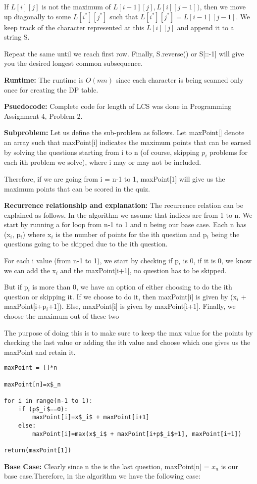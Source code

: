 \documentclass[letterpaper,11pt]{article}
\newcounter{problemid}\stepcounter{problemid}
\def\newproblem{\vspace*{0.5cm}{\bf Problem~\arabic{problemid}\stepcounter{problemid}}\hfill\fbox{\parbox{0.16\textwidth}{\bf Points:}}\par}
\begin{document}
If $L[i][j]$ is not the maximum of $L[i-1][j], L[i][j-1])$, then we move up diagonally to some $L[i^*][j^*]$ such that $L[i^*][j^*] =  L[i-1][j-1]$. We keep track of the character represented at this $L[i][j]$ and append it to a string S.

Repeat the same until we reach first row. Finally, S.reverse() or S[::-1] will give you the desired longest common subsequence.

{\bf Runtime:} The runtime is $O(mn)$ since each character is being scanned only once for creating the DP table. 

{\bf Psuedocode: }Complete code for length of LCS was done in Programming Assignment 4, Problem 2. 


\newproblem
{\bf Subproblem:} Let us define the sub-problem as follows. Let maxPoint[] denote an array such that maxPoint[i] indicates the maximum points that can be earned by solving the questions starting from i to n (of course, skipping $p_i$ problems for each ith problem we solve), where i may or may not be included. 

Therefore, if we are going from i = n-1 to 1, maxPoint[1] will give us the maximum points that can be scored in the quiz. 

{\bf Recurrence relationship and explanation:} The recurrence relation can be explained as follows. In the algorithm we assume that indices are from 1 to n. We start by running a for loop from n-1 to 1 and n being our base case. Each n has (x$_i$, p$_i$) where x$_i $ is the number of points for the ith question and p$_i$ being the questions going to be skipped due to the ith question. 

For each i value (from n-1 to 1), we start by checking if p$_i$ is 0, if it is 0, we know we can add the x$_i$ and the maxPoint[i+1], no question has to be skipped. 

But if p$_i$ is more than 0, we have an option of either choosing to do the ith question or skipping it. If we choose to do it, then maxPoint[i] is given by (x$_i$ + maxPoint[i+p$_i$+1]). Else, maxPoint[i] is given by maxPoint[i+1]. Finally, we choose the maximum out of these two 

The purpose of doing this is to make sure to keep the max value for the points by checking the last value or adding the ith value and choose which one gives us the maxPoint and retain it.

\begin{Verbatim}[commandchars=\\\{\},codes={\catcode`$=3\catcode`_=8}]
maxPoint = []*n

maxPoint[n]=x$_n

for i in range(n-1 to 1):
    if (p$_i$==0):
        maxPoint[i]=x$_i$ + maxPoint[i+1]
    else:
        maxPoint[i]=max(x$_i$ + maxPoint[i+p$_i$+1], maxPoint[i+1])
        
return(maxPoint[1])
\end{Verbatim}      
{\bf Base Case:} Clearly since n the is the last question, maxPoint[n] = $x_n$ is our base case.Therefore, in the algorithm we have the following case:
\end{document}
